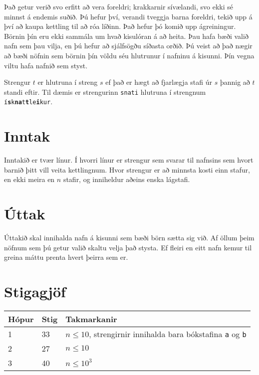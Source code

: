 %
Það getur verið svo erfitt að vera foreldri; krakkarnir sívælandi, svo ekki sé minnst á endemis suðið.
Þú hefur því, verandi tveggja barna foreldri, tekið upp á því að kaupa kettling til að róa líðinn.
Það hefur þó komið upp ágreiningur.
Börnin þín eru ekki sammála um hvað kisulóran á að heita.
Þau hafa bæði valið nafn sem þau vilja, en þú hefur að sjálfsögðu síðasta orðið.
Þú veist að það nægir að bæði nöfnin sem börnin þín völdu séu hlutrunur í nafninu á kisunni.
Þín vegna viltu hafa nafnið sem styst.

Strengur $t$ er hlutruna í streng $s$ ef það er hægt að fjarlægja stafi úr
$s$ þannig að $t$ standi eftir. Til dæmis er strengurinn \texttt{snati}
hlutruna í strengnum \texttt{í\textbf{s}k\textbf{n}\textbf{a}t\textbf{t}le\textbf{i}kur}.

\section*{Inntak}
Inntakið er tvær línur.
Í hvorri línur er strengur sem svarar til nafnsins sem hvort barnið þitt vill veita kettlingnum.
Hvor strengur er að minnsta kosti einn stafur, en ekki meira en $n$ stafir,
og inniheldur aðeins enska lágstafi.

\section*{Úttak}
Úttakið skal innihalda nafn á kisunni sem bæði börn sætta sig við.
Af öllum þeim nöfnum sem þú getur valið skaltu velja það stysta.
Ef fleiri en eitt nafn kemur til greina máttu prenta hvert þeirra sem er.

\section*{Stigagjöf}
\begin{tabular}{|l|l|l|}
\hline
Hópur & Stig & Takmarkanir \\ \hline
1     & 33   & $n \leq 10$, strengirnir innihalda bara bókstafina \texttt{a} og \texttt{b}\\ \hline
2     & 27   & $n \leq 10$\\ \hline
3     & 40   & $n \leq 10^3$\\ \hline
\end{tabular}

